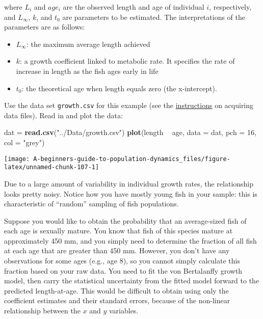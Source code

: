 \documentclass[]{book}
\newenvironment{Shaded}{\begin{snugshade}}{\end{snugshade}}
\newcommand{\DataTypeTok}[1]{\textcolor[rgb]{0.13,0.29,0.53}{#1}}
\newcommand{\DecValTok}[1]{\textcolor[rgb]{0.00,0.00,0.81}{#1}}
\newcommand{\KeywordTok}[1]{\textcolor[rgb]{0.13,0.29,0.53}{\textbf{#1}}}
\newcommand{\NormalTok}[1]{#1}
\newcommand{\OperatorTok}[1]{\textcolor[rgb]{0.81,0.36,0.00}{\textbf{#1}}}
\newcommand{\StringTok}[1]{\textcolor[rgb]{0.31,0.60,0.02}{#1}}
\providecommand{\tightlist}{%
  \setlength{\itemsep}{0pt}\setlength{\parskip}{0pt}}
\begin{document}
where \(L_i\) and \(age_i\) are the observed length and age of individual \(i\), respectively, and \(L_{\infty}\), \(k\), and \(t_0\) are parameters to be estimated. The interpretations of the parameters are as follows:

\begin{itemize}
\tightlist
\item
  \(L_{\infty}\): the maximum average length achieved
\item
  \(k\): a growth coefficient linked to metabolic rate. It specifies the rate of increase in length as the fish ages early in life
\item
  \(t_0\): the theoretical age when length equals zero (the x-intercept).
\end{itemize}

Use the data set \texttt{growth.csv} for this example (see the \protect\hyperlink{data-sets}{instructions} on acquiring data files). Read in and plot the data:

\begin{Shaded}
\begin{Highlighting}[]
\NormalTok{dat =}\StringTok{ }\KeywordTok{read.csv}\NormalTok{(}\StringTok{"../Data/growth.csv"}\NormalTok{)}
\KeywordTok{plot}\NormalTok{(length }\OperatorTok{~}\StringTok{ }\NormalTok{age, }\DataTypeTok{data =}\NormalTok{ dat, }\DataTypeTok{pch =} \DecValTok{16}\NormalTok{, }\DataTypeTok{col =} \StringTok{"grey"}\NormalTok{)}
\end{Highlighting}
\end{Shaded}

\begin{center}\texttt{[image: A-beginners-guide-to-population-dynamics\_files/figure-latex/unnamed-chunk-107-1]} \end{center}

Due to a large amount of variability in individual growth rates, the relationship looks pretty noisy. Notice how you have mostly young fish in your sample: this is characteristic of ``random'' sampling of fish populations.

Suppose you would like to obtain the probability that an average-sized fish of each age is sexually mature. You know that fish of this species mature at approximately 450 mm, and you simply need to determine the fraction of all fish at each age that are greater than 450 mm. However, you don't have any observations for some ages (e.g., age 8), so you cannot simply calculate this fraction based on your raw data. You need to fit the von Bertalanffy growth model, then carry the statistical uncertainty from the fitted model forward to the predicted length-at-age. This would be difficult to obtain using only the coefficient estimates and their standard errors, because of the non-linear relationship between the \(x\) and \(y\) variables.
\end{document}
